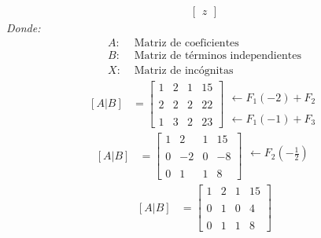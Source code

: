 \documentclass[10pt, a4paper]{article}
\begin{document}
\begin{multicols}{2}
\begin{align*}
\begin{bmatrix}
    z
  \end{bmatrix}
\end{align*}
\textit{Donde:}
\begin{align*}
  A: &\text{ Matriz de coeficientes}\\
  B: &\text{ Matriz de términos independientes}\\
  X: &\text{ Matriz de incógnitas}
\end{align*}
\begin{align*}
  \left[A|B\right]&=\left[
    \begin{array}{ccc|c}
      1 & 2 & 1 & 15 \\\\
      2 & 2 & 2 & 22 \\\\
      1 & 3 & 2 & 23
    \end{array}
  \right]
  \begin{array}{r}
    \\\\
    \leftarrow F_1\left(-2\right)+F_2 \\\\
    \leftarrow F_1\left(-1\right)+F_3
  \end{array}
\end{align*}
\begin{align*}
  \left[A|B\right]&=\left[
    \begin{array}{ccc|c}
      1 & 2 & 1 & 15 \\\\
      0 & -2 & 0 & -8 \\\\
      0 & 1 & 1 & 8
    \end{array}
  \right]
  \begin{array}{r}
    \\
    \leftarrow F_2\left(-\frac{1}{2}\right)
    \\\\
  \end{array}
\end{align*}
\begin{align*}
  \left[A|B\right]&=\left[
    \begin{array}{ccc|c}
      1 & 2 & 1 & 15 \\\\
      0 & 1 & 0 & 4 \\\\
      0 & 1 & 1 & 8
    \end{array}
  \right]

\end{align*}
\end{multicols}
\end{document}

